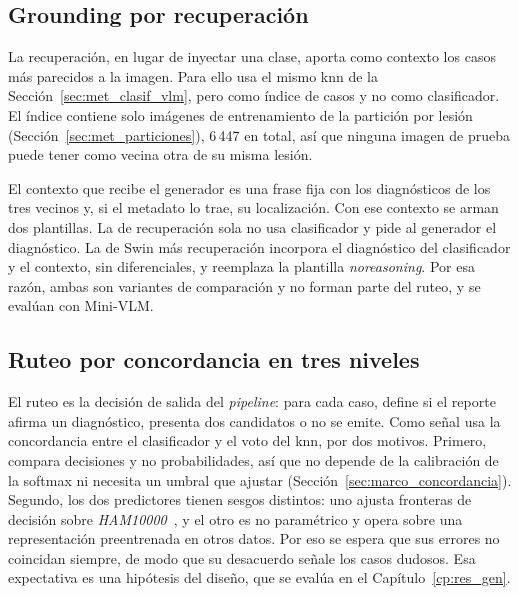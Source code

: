 \subsection{Grounding por recuperación}
\label{sec:met_recuperacion}

La recuperación, en lugar de inyectar una clase, aporta como contexto los casos más parecidos a la imagen. Para ello usa
el mismo \gls{knn} de la Sección~\ref{sec:met_clasif_vlm}, pero como índice de casos y no como clasificador. El índice
contiene solo imágenes de entrenamiento de la partición por lesión (Sección~\ref{sec:met_particiones}), 6\,447 en
total, así que ninguna imagen de prueba puede tener como vecina otra de su misma lesión.

El contexto que recibe el generador es una frase fija con los diagnósticos de los tres vecinos y, si el metadato lo
trae, su localización. Con ese contexto se arman dos plantillas. La de recuperación sola no usa clasificador y pide al
generador el diagnóstico. La de Swin más recuperación incorpora el diagnóstico del clasificador y el contexto, sin
diferenciales, y reemplaza la plantilla \emph{noreasoning}. Por esa razón, ambas son variantes de comparación y no
forman parte del ruteo, y se evalúan con Mini-VLM.

\subsection{Ruteo por concordancia en tres niveles}
\label{sec:met_ruteo}

El ruteo es la decisión de salida del \emph{pipeline}: para cada caso, define si el reporte afirma un diagnóstico,
presenta dos candidatos o no se emite. Como señal usa la concordancia entre el clasificador y el voto del \gls{knn}, por
dos motivos. Primero, compara decisiones y no probabilidades, así que no depende de la calibración de la softmax ni
necesita un umbral que ajustar (Sección~\ref{sec:marco_concordancia}). Segundo, los dos predictores tienen sesgos
distintos: uno ajusta fronteras de decisión sobre \emph{HAM10000}~\cite{tschandl2018ham10000}, y el otro es no
paramétrico y opera sobre una representación preentrenada en otros datos. Por eso se espera que sus errores no
coincidan siempre, de modo que su desacuerdo señale los casos dudosos. Esa expectativa es una hipótesis del diseño, que
se evalúa en el Capítulo~\ref{cp:res_gen}.

